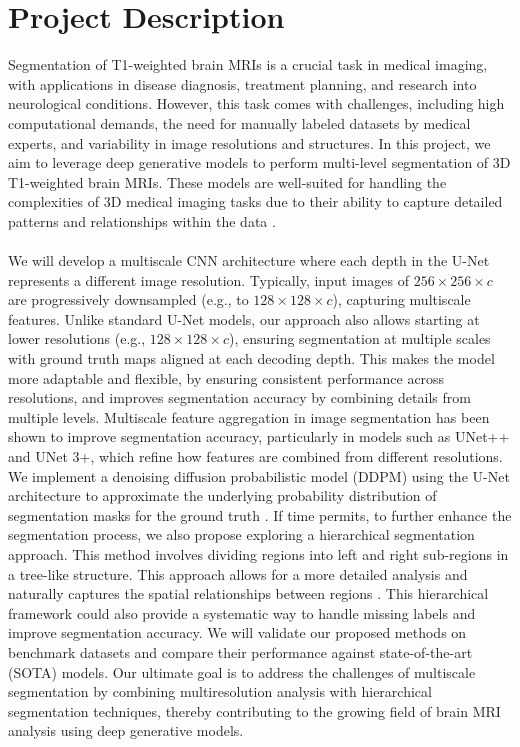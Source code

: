 \documentclass[12pt]{report}
\begin{document}
\section*{Project Description}
Segmentation of T1-weighted brain MRIs is a crucial task in medical imaging, with applications in disease diagnosis, treatment planning, and research into neurological conditions. However, this task comes with challenges, including high computational demands, the need for manually labeled datasets by medical experts, and variability in image resolutions and structures. 
\newline
\newline
In this project, we aim to leverage deep generative models to perform multi-level segmentation of 3D T1-weighted brain MRIs. These models are well-suited for handling the complexities of 3D medical imaging tasks due to their ability to capture detailed patterns and relationships within the data \cite{wu2023medsegdiff}.\\\\
We will develop a multiscale CNN architecture where each depth in the U-Net represents a different image resolution. Typically, input images of \(256 \times 256 \times c\) are progressively downsampled (e.g., to \(128 \times 128 \times c\)), capturing multiscale features. Unlike standard U-Net models, our approach also allows starting at lower resolutions (e.g., \(128 \times 128 \times c\)), ensuring segmentation at multiple scales with ground truth maps aligned at each decoding depth. This makes the model more adaptable and flexible, by ensuring consistent performance across resolutions, and improves segmentation accuracy by combining details from multiple levels.
Multiscale feature aggregation in image segmentation has been shown to improve segmentation accuracy, particularly in models such as UNet++ and UNet 3+, which refine how features are combined from different resolutions.
We implement a denoising diffusion probabilistic model (DDPM) using the U-Net architecture to approximate the underlying probability distribution of segmentation masks for the ground truth \cite{zhou2020unet++,huang2021unet3+}. 
\newline
\newline
If time permits, to further enhance the segmentation process, we also propose exploring a hierarchical segmentation approach. This method involves dividing regions into left and right sub-regions in a tree-like structure. This approach allows for a more detailed analysis and naturally captures the spatial relationships between regions \cite{ghazi2022fastaid}. This hierarchical framework could also provide a systematic way to handle missing labels and improve segmentation accuracy.
\newline
\newline
We will validate our proposed methods on benchmark datasets and compare their performance against state-of-the-art (SOTA) models. 
Our ultimate goal is to address the challenges of multiscale segmentation by combining multiresolution analysis with hierarchical segmentation techniques, thereby contributing to the growing field of brain MRI analysis using deep generative models.
\end{document}

